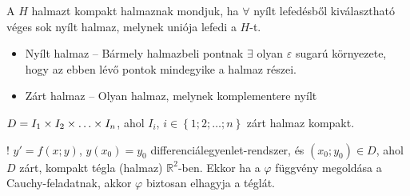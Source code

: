 \documentclass[main.tex]{subfiles}
\begin{document}

A $H$ halmazt kompakt halmaznak mondjuk, ha $\forall$
nyílt lefedésből kiválasztható véges sok nyílt halmaz,
melynek uniója lefedi a $H$-t.




\begin{itemize}
  \item Nyílt halmaz – Bármely halmazbeli pontnak $\exists$ olyan
        $\varepsilon$ sugarú környezete, hogy az ebben lévő pontok
        mindegyike a halmaz részei.

  \item Zárt halmaz – Olyan halmaz, melynek komplementere nyílt
\end{itemize}




$D = I_1 \cross I_2 \cross \dots \cross I_n$, ahol
$I_i$, $i \in \left\{1;2;\dots;n\right\}$ zárt halmaz
kompakt.





! $y' = f(x; y)$, $y(x_0) = y_0$ differenciálegyenlet-rendszer, és
$\left( x_0; y_0 \right) \in D$, ahol $D$ zárt, kompakt tégla (halmaz)
$\mathbb{R}^2$-ben. Ekkor ha a $\varphi$ függvény megoldása a
Cauchy-feladatnak, akkor $\varphi$ biztosan elhagyja a téglát.







\end{document}
